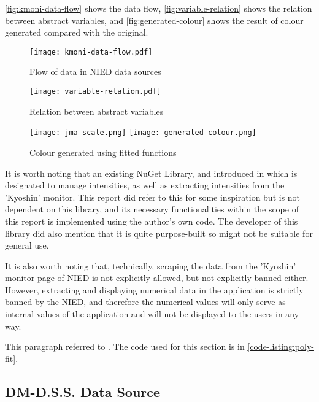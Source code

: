 \autoref{fig:kmoni-data-flow} shows the data flow, \autoref{fig:variable-relation} shows the relation between abstract variables, and \autoref{fig:generated-colour} shows the result of colour generated compared with the original.

\begin{figure}[htp]
    \centering
    \texttt{[image: kmoni-data-flow.pdf]}
    \caption{Flow of data in NIED data sources}
    \label{fig:kmoni-data-flow}
\end{figure}

\begin{figure}[htp]
    \centering
    \texttt{[image: variable-relation.pdf]}
    \caption{Relation between abstract variables}
    \label{fig:variable-relation}
\end{figure}

\begin{figure}[htp]
    \centering
    \texttt{[image: jma-scale.png]}
    \texttt{[image: generated-colour.png]}
    \caption{Colour generated using fitted functions}
    \label{fig:generated-colour}
\end{figure}

It is worth noting that an existing NuGet Library,  \autocite{soft-kyoshin-monitor-lib} and introduced in \autocite{blog-ingen-kmoni-nuget-lib} which is designated to manage intensities, as well as extracting intensities from the 'Kyoshin' monitor. This report did refer to this for some inspiration but is not dependent on this library, and its necessary functionalities within the scope of this report is implemented using the author's own code. The developer of this library did also mention that it is quite purpose-built so might not be suitable for general use.

It is also worth noting that, technically, scraping the data from the 'Kyoshin' monitor page of NIED is not explicitly allowed, but not explicitly banned either. However, extracting and displaying numerical data in the application is strictly banned by the NIED, and therefore the numerical values will only serve as internal values of the application and will not be displayed to the users in any way.

This paragraph referred to \autocite{blog-jquake-poly-fit}. The code used for this section is in \autoref{code-listing:poly-fit}.

\subsection{DM-D.S.S. Data Source}

